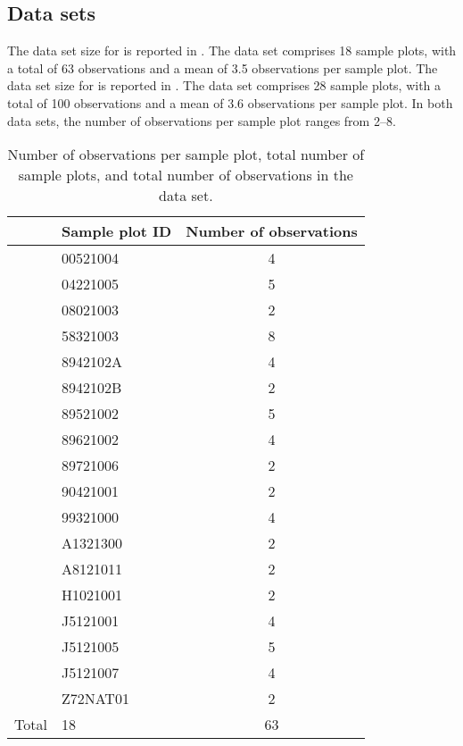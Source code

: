 \subsection{Data sets}

The data set size for \Beech{} is reported in .  The data set comprises 18 sample plots, with a total of 63 observations and a mean of \num{3.5} observations per sample plot.  The data set size for \Spruce{} is reported in .  The data set comprises 28 sample plots, with a total of 100 observations and a mean of \num{3.6} observations per sample plot.  In both data sets, the number of observations per sample plot ranges from \numrange{2}{8}.

\newpage{}  %
\begin{singlespace}
  {\tabulinesep=2mm
    \begin{longtabu}{l L S[table-figures-decimal = 0]}
      \caption{Number of observations per sample plot, total number of sample plots, and total number of observations in the \Beech{} data set. \label{tab:ObservationsCountPerEdvidBeech}} \\
      \toprule
      & Sample plot ID & {Number of observations} \\
      \midrule
      \endhead
      \bottomrule
      \endlastfoot
      & 00521004 & 4 \\
      & 04221005 & 5 \\
      & 08021003 & 2 \\
      & 58321003 & 8 \\
      & 8942102A & 4 \\
      & 8942102B & 2 \\
      & 89521002 & 5 \\
      & 89621002 & 4 \\
      & 89721006 & 2 \\
      & 90421001 & 2 \\
      & 99321000 & 4 \\
      & A1321300 & 2 \\
      & A8121011 & 2 \\
      & H1021001 & 2 \\
      & J5121001 & 4 \\
      & J5121005 & 5 \\
      & J5121007 & 4 \\
      & Z72NAT01 & 2 \\
      Total & 18 & 63 \\
    \end{longtabu}
  }
\end{singlespace}

